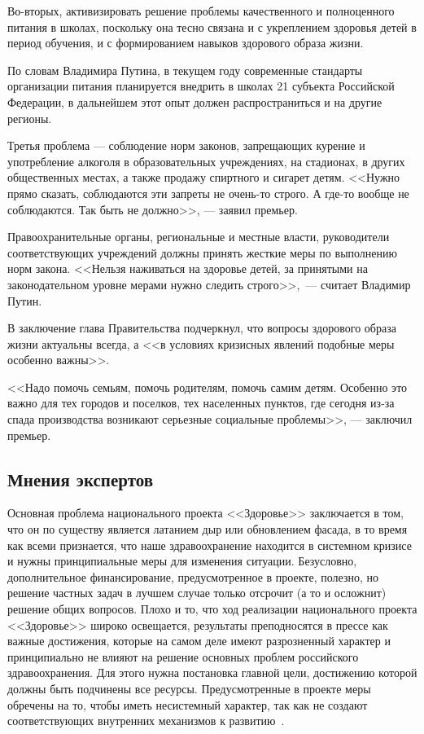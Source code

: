 \documentclass[article, 12pt, russian, oneside]{ncc}
\begin{document}
Во-вторых, активизировать решение проблемы качественного и
полноценного питания в школах, поскольку она тесно связана и с
укреплением здоровья детей в период обучения, и с формированием
навыков здорового образа жизни.

По словам Владимира Путина, в текущем году современные стандарты
организации питания планируется внедрить в школах 21 субъекта
Российской Федерации, в дальнейшем этот опыт должен распространиться и
на другие регионы.

Третья проблема --- соблюдение норм законов, запрещающих курение и
употребление алкоголя в образовательных учреждениях, на стадионах, в
других общественных местах, а также продажу спиртного и сигарет
детям. <<Нужно прямо сказать, соблюдаются эти запреты не очень-то
строго. А где-то вообще не соблюдаются. Так быть не должно>>, --- заявил
премьер.

Правоохранительные органы, региональные и местные власти, руководители
соответствующих учреждений должны принять жесткие меры по выполнению
норм закона. <<Нельзя наживаться на здоровье детей, за принятыми на
законодательном уровне мерами нужно следить строго>>,~--- считает
Владимир Путин.

В заключение глава Правительства подчеркнул, что вопросы здорового
образа жизни актуальны всегда, а <<в условиях кризисных явлений
подобные меры особенно важны>>.

<<Надо помочь семьям, помочь родителям, помочь самим детям. Особенно
это важно для тех городов и поселков, тех населенных пунктов, где
сегодня из-за спада производства возникают серьезные социальные
проблемы>>, --- заключил премьер.

\subsection{Мнения экспертов}

Основная проблема национального проекта <<Здоровье>> заключается в
том, что он по существу является латанием дыр или обновлением фасада,
в то время как всеми признается, что наше здравоохранение находится в
системном кризисе и нужны принципиальные меры для изменения ситуации.
Безусловно, дополнительное финансирование, предусмотренное в проекте,
полезно, но решение частных задач в лучшем случае только отсрочит (а
то и осложнит) решение общих вопросов. Плохо и то, что ход реализации
национального проекта <<Здоровье>> широко освещается, результаты
преподносятся в прессе как важные достижения, которые на самом деле
имеют разрозненный характер и принципиально не влияют на решение
основных проблем российского здравоохранения. Для этого нужна
постановка главной цели, достижению которой должны быть подчинены все
ресурсы. Предусмотренные в проекте меры обречены на то, чтобы иметь
несистемный характер, так как не создают соответствующих внутренних
механизмов к развитию~\cite{Spero}.
     
\end{document}
